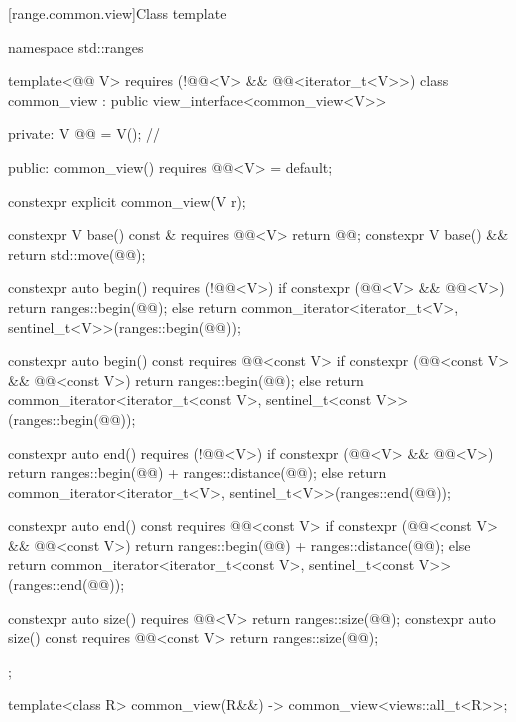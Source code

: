 [range.common.view]{Class template }

%
%
%
%
%
\begin{codeblock}
namespace std::ranges {
  template<@@ V>
    requires (!@@<V> && @@<iterator_t<V>>)
  class common_view : public view_interface<common_view<V>> {
  private:
    V @@ = V();  // \expos

  public:
    common_view() requires @@<V> = default;

    constexpr explicit common_view(V r);

    constexpr V base() const & requires @@<V> { return @@; }
    constexpr V base() && { return std::move(@@); }

    constexpr auto begin() requires (!@@<V>) {
      if constexpr (@@<V> && @@<V>)
        return ranges::begin(@@);
      else
        return common_iterator<iterator_t<V>, sentinel_t<V>>(ranges::begin(@@));
    }

    constexpr auto begin() const requires @@<const V> {
      if constexpr (@@<const V> && @@<const V>)
        return ranges::begin(@@);
      else
        return common_iterator<iterator_t<const V>, sentinel_t<const V>>(ranges::begin(@@));
    }

    constexpr auto end() requires (!@@<V>) {
      if constexpr (@@<V> && @@<V>)
        return ranges::begin(@@) + ranges::distance(@@);
      else
        return common_iterator<iterator_t<V>, sentinel_t<V>>(ranges::end(@@));
    }

    constexpr auto end() const requires @@<const V> {
      if constexpr (@@<const V> && @@<const V>)
        return ranges::begin(@@) + ranges::distance(@@);
      else
        return common_iterator<iterator_t<const V>, sentinel_t<const V>>(ranges::end(@@));
    }

    constexpr auto size() requires @@<V> {
      return ranges::size(@@);
    }
    constexpr auto size() const requires @@<const V> {
      return ranges::size(@@);
    }
  };

  template<class R>
    common_view(R&&) -> common_view<views::all_t<R>>;
}
\end{codeblock}


